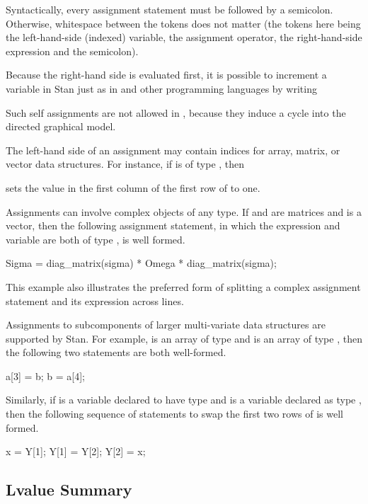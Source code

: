 Syntactically, every assignment statement must be followed by a
semicolon.  Otherwise, whitespace between the tokens does not matter
(the tokens here being the left-hand-side (indexed) variable, the
assignment operator, the right-hand-side expression and the
semicolon).

Because the right-hand side is evaluated first, it is possible to
increment a variable in Stan just as in \Cpp and other programming
languages by writing
%
\begin{quote}
\end{quote}
%
Such self assignments are not allowed in \BUGS, because they induce a
cycle into the directed graphical model.

The left-hand side of an assignment may contain indices for array,
matrix, or vector data structures.  For instance, if  is
of type , then
%
\begin{quote}
\end{quote}
%
sets the value in the first column of the first row of  to one.

Assignments can involve complex objects of any type.  If 
and  are matrices and  is a vector, then the
following assignment statement, in which the expression and variable
are both of type , is well formed.
%
\begin{stancode}
Sigma
  = diag_matrix(sigma)
     * Omega
     * diag_matrix(sigma);
\end{stancode}
%
This example also illustrates the preferred form of splitting a
complex assignment statement and its expression across lines.

Assignments to subcomponents of larger multi-variate data structures
are supported by Stan.  For example,  is an array of type
 and  is an array of type , then
the following two statements are both well-formed.
%
\begin{stancode}
a[3] = b;
b = a[4];
\end{stancode}
%
Similarly, if  is a variable declared to have type
 and  is a variable declared as type
, then the following sequence of statements to swap the
first two rows of  is well formed.
%
\begin{stancode}
x = Y[1];
Y[1] = Y[2];
Y[2] = x;
\end{stancode}
%

\subsection{Lvalue Summary}

